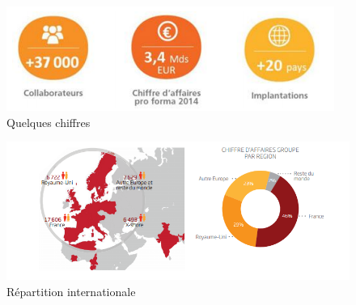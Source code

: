 \begin{figure}[h]
	\includegraphics[scale=1]{images/sopraSteriaChiffres.png}
	\centering
	\caption{Quelques chiffres}
	\label{sopraSteriaChiffres}
\end{figure}

\begin{figure}[h]
	\includegraphics[scale=0.9]{images/sopraSteriaMonde.png}
	\centering
	\caption{Répartition internationale}
	\label{sopraSteriaMonde}
\end{figure}
		
		